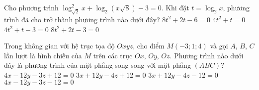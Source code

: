 \begin{ex}%
Cho phương trình $\log_{\sqrt{2}}^2x+\log_2\left(x\sqrt{8}\right)-3=0$. Khi đặt $t=\log_2x$, phương trình đã cho trở thành phương trình nào dưới đây?
\choice
{$8t^2+2t-6=0$}
{$4t^2+t=0$}
{$4t^2+t-3=0$}
{\True $8t^2+2t-3=0$}
\end{ex}

\begin{ex}%
Trong không gian với hệ trục tọa độ $Oxyz$, cho điểm $M(-3;1;4)$ và gọi $A$, $B$, $C$ lần lượt là hình chiếu của $M$ trên các trục $Ox$, $Oy$, $Oz$. Phương trình nào dưới đây là phương trình của mặt phẳng song song với mặt phẳng $(ABC)$?
\choice
{$4x-12y-3z+12=0$}
{$3x+12y-4z+12=0$}
{$3x+12y-4z-12=0$}
{\True $4x-12y-3z-12=0$}
\end{ex}

